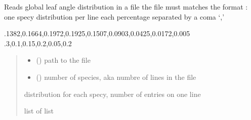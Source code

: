 \documentclass[letterpaper,10pt,english]{sphinxmanual}
\begin{document}
\begin{fulllineitems}
\label{\detokenize{reference:leafangles.read_distrib_file}}
\pysigstartsignatures
{}
\pysigstopsignatures
\sphinxAtStartPar
Reads global leaf angle distribution in a file
the file must matches the format : one specy distribution per line
each percentage separated by a coma ‘,’

\sphinxAtStartPar
{}

\begin{sphinxVerbatim}[commandchars=\\\{\}]
.1382,0.1664,0.1972,0.1925,0.1507,0.0903,0.0425,0.0172,0.005
.3,0.1,0.15,0.2,0.05,0.2
\end{sphinxVerbatim}
\begin{quote}\begin{description}
\begin{itemize}
\item {} 
\sphinxAtStartPar
{} () \textendash{} path to the file

\item {} 
\sphinxAtStartPar
{} () \textendash{} number of species, aka numbre of lines in the file

\end{itemize}

\sphinxAtStartPar
distribution for each specy, number of entries on one line

\sphinxAtStartPar
list of list

\end{description}\end{quote}

\end{fulllineitems}

\end{document}
